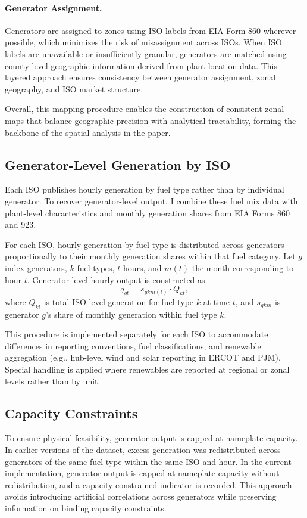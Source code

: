 \documentclass[12pt]{article}
\begin{document}
\paragraph{Generator Assignment.}
Generators are assigned to zones using ISO labels from EIA Form 860 wherever possible, which minimizes the risk of misassignment across ISOs. When ISO labels are unavailable or insufficiently granular, generators are matched using county-level geographic information derived from plant location data. This layered approach ensures consistency between generator assignment, zonal geography, and ISO market structure.

Overall, this mapping procedure enables the construction of consistent zonal maps that balance geographic precision with analytical tractability, forming the backbone of the spatial analysis in the paper.

\subsection{Generator-Level Generation by ISO}

Each ISO publishes hourly generation by fuel type rather than by individual generator. To recover generator-level output, I combine these fuel mix data with plant-level characteristics and monthly generation shares from EIA Forms 860 and 923.

For each ISO, hourly generation by fuel type is distributed across generators proportionally to their monthly generation shares within that fuel category. Let $g$ index generators, $k$ fuel types, $t$ hours, and $m(t)$ the month corresponding to hour $t$. Generator-level hourly output is constructed as
\[
q_{g t} = s_{g k m(t)} \cdot Q_{k t},
\]
where $Q_{k t}$ is total ISO-level generation for fuel type $k$ at time $t$, and $s_{g k m}$ is generator $g$’s share of monthly generation within fuel type $k$.

This procedure is implemented separately for each ISO to accommodate differences in reporting conventions, fuel classifications, and renewable aggregation (e.g., hub-level wind and solar reporting in ERCOT and PJM). Special handling is applied where renewables are reported at regional or zonal levels rather than by unit.

\subsection{Capacity Constraints}

To ensure physical feasibility, generator output is capped at nameplate capacity. In earlier versions of the dataset, excess generation was redistributed across generators of the same fuel type within the same ISO and hour. In the current implementation, generator output is capped at nameplate capacity without redistribution, and a capacity-constrained indicator is recorded. This approach avoids introducing artificial correlations across generators while preserving information on binding capacity constraints.
\end{document}
